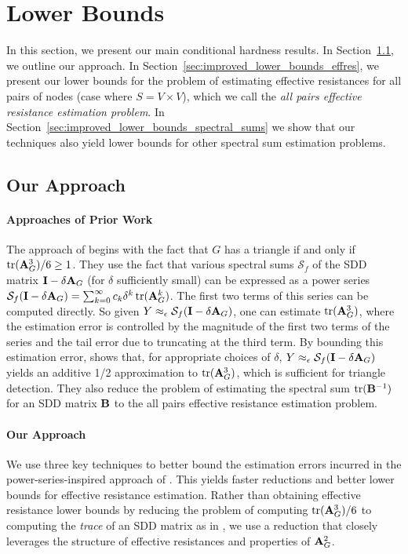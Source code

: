 

\section{Lower Bounds}
\label{sec:lower_bounds}

In this section, we present our main conditional hardness results. In Section~\ref{sec:lb_overview}, we outline our approach. In Section~\ref{sec:improved_lower_bounds_effres}, we present our lower bounds for the problem of estimating effective resistances for all pairs of nodes (case where $S = V \times V$), which we call the \emph{all pairs effective resistance estimation problem}. In Section~\ref{sec:improved_lower_bounds_spectral_sums} we show that our techniques also yield lower bounds for other spectral sum estimation problems.
\subsection{Our Approach}\label{sec:lb_overview}
\paragraph{Approaches of Prior Work}
The approach of \cite{musco2017spectrum} begins with the fact that $G$ has a triangle if and only if $\mathrm{tr}(\mathbf{A}_G^3)/6 \geq 1$. They use the fact that various spectral sums $\mathcal{S}_f$ of the SDD matrix $\mathbf{I} - \delta \mathbf{A}_G$ (for $\delta$ sufficiently small) can be expressed as a power series $\mathcal{S}_f(\mathbf{I} - \delta \mathbf{A}_G) = \sum_{k=0}^\infty c_k \delta^k \operatorname*{\text{tr}}(\mathbf{A}_G^k)$.
The first two terms of this series can be computed directly. So given $Y \approx_\epsilon \mathcal{S}_f(\mathbf{I} - \delta \mathbf{A}_G)$, one can estimate $\mathrm{tr}(\mathbf{A}_G^3)$, where the estimation error is controlled by the magnitude of the first two terms of the series and the tail error due to truncating at the third term. By bounding this estimation error, \cite{musco2017spectrum} shows that, for appropriate choices of $\delta$, $Y \approx_\epsilon \mathcal{S}_f(\mathbf{I} - \delta \mathbf{A}_G)$ yields an additive 1/2 approximation to $\mathrm{tr}(\mathbf{A}_G^3)$, which is sufficient for triangle detection. They also reduce the problem of estimating the spectral sum $\mathrm{tr}(\mathbf{B}^{-1})$ for an SDD matrix $\mathbf{B}$ to the all pairs effective resistance estimation problem. 

\paragraph{Our Approach} We use three key techniques to better bound the estimation errors incurred in the power-series-inspired approach of \cite{musco2017spectrum}. This yields faster reductions and better lower bounds for effective resistance estimation. Rather than obtaining effective resistance lower bounds by reducing the problem of computing $\mathrm{tr}(\mathbf{A}_G^3)/6$ to computing the \emph{trace} of an SDD matrix as in \cite{musco2017spectrum}, we use a reduction that closely leverages the structure of effective resistances and properties of $\mathbf{A}_G^2$. 

